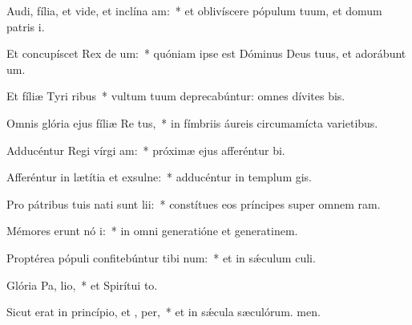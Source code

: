 \item Audi, fília, et vide, et inclína  am:~* et oblivíscere pópulum tuum, et domum patris i.
\item Et concupíscet Rex de um:~* quóniam ipse est Dóminus Deus tuus, et adorábunt um.
\item Et fíliæ Tyri  ribus~* vultum tuum deprecabúntur: omnes dívites bis.
\item Omnis glória ejus fíliæ Re  tus,~* in fímbriis áureis circumamícta varietibus.
\item Adducéntur Regi vírgi  am:~* próximæ ejus afferéntur bi.
\item Afferéntur in lætítia et exsulne:~* adducéntur in templum gis.
\item Pro pátribus tuis nati sunt  lii:~* constítues eos príncipes super omnem ram.
\item Mémores erunt nó i:~* in omni generatióne et generatinem.
\item Proptérea pópuli confitebúntur tibi  num:~* et in sǽculum culi.
\item Glória Pa,  lio,~* et Spirítui to.
\item Sicut erat in princípio, et ,  per,~* et in sǽcula sæculórum. men.
